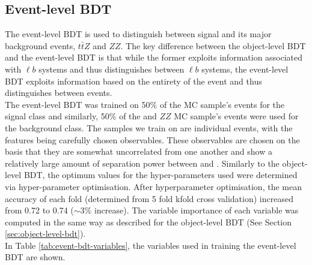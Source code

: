 \subsection{Event-level BDT}
\label{sec:event-level-bdt}
The event-level BDT is used to distinguish between signal and its major background events, $t\bar{t}Z$ and $ZZ$. The key difference between the object-level BDT and the event-level BDT is that while the former exploits information associated with $\ell b$ systems and thus distinguishes between $\ell b$ systems, the event-level BDT exploits information based on the entirety of the event and thus distinguishes between events.\\

The event-level BDT was trained on 50$\%$ of the \tWZ MC sample's events for the signal class and similarly, 50$\%$ of the \ttZ and $ZZ$ MC sample's events were used for the background class. The samples we train on are individual events, with the features being carefully chosen observables. These observables are chosen on the basis that they are somewhat uncorrelated from one another and show a relatively large amount of separation power between \tWZ and \ttZ. Similarly to the object-level BDT, the optimum values for the hyper-parameters used were determined via hyper-parameter optimisation.  After hyperparameter optimisation, the mean accuracy of each fold (determined from 5 fold kfold cross validation) increased from 0.72 to 0.74 ($\sim 3\%$ increase). The variable importance of each variable was computed in the same way as described for the object-level BDT (See Section \ref{sec:object-level-bdt}).\\

In Table \ref{tab:event-bdt-variables}, the variables used in training the event-level BDT are shown.
\begin{table}[htbp!]

\caption{A list of the observables used in the event-level BDT, ordered by variable importance (descending, top to bottom) is shown.}
	\label{tab:event-bdt-variables}
\end{table}

